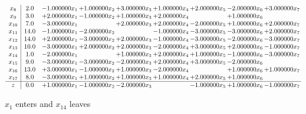 \documentclass[10pt]{article}
\begin{document}
\[\begin{array}{c| c c@{\hskip 2pt} c@{\hskip 2pt} c@{\hskip 2pt} c@{\hskip 2pt} c@{\hskip 2pt} c@{\hskip 2pt} c@{\hskip 2pt} }
 x_{8}   &  2.0 & -1.000000 x_{1} & + 1.000000 x_{2} & + 3.000000 x_{3} & + 1.000000 x_{4} & + 2.000000 x_{5} & -2.000000 x_{6} & + 3.000000 x_{7}\\
 x_{9}   &  3.0 & + 2.000000 x_{1} & -1.000000 x_{2} & + 1.000000 x_{3} & + 2.000000 x_{4} &   & + 1.000000 x_{6} &   \\
 x_{10}   &  7.0 & -3.000000 x_{1} &   & + 2.000000 x_{3} & + 2.000000 x_{4} & -2.000000 x_{5} & + 1.000000 x_{6} & + 2.000000 x_{7}\\
 x_{11}   &  14.0 & -1.000000 x_{1} & -2.000000 x_{2} &   & -1.000000 x_{4} & -3.000000 x_{5} & -3.000000 x_{6} & + 2.000000 x_{7}\\
 x_{12}   &  14.0 & + 2.000000 x_{1} & -3.000000 x_{2} & + 2.000000 x_{3} & -1.000000 x_{4} & -3.000000 x_{5} & -2.000000 x_{6} & -3.000000 x_{7}\\
 x_{13}   &  10.0 & -3.000000 x_{1} & + 2.000000 x_{2} & + 2.000000 x_{3} & -2.000000 x_{4} & + 3.000000 x_{5} & + 2.000000 x_{6} & -1.000000 x_{7}\\
 x_{14}   &  1.0 & -2.000000 x_{1} &   & + 1.000000 x_{3} & + 2.000000 x_{4} & + 1.000000 x_{5} & -1.000000 x_{6} & -3.000000 x_{7}\\
 x_{15}   &  9.0 & -3.000000 x_{1} & -3.000000 x_{2} & -2.000000 x_{3} & + 2.000000 x_{4} & + 3.000000 x_{5} & -2.000000 x_{6} &   \\
 x_{16}   &  13.0 & + 3.000000 x_{1} & -1.000000 x_{2} & + 1.000000 x_{3} & -2.000000 x_{4} &   & + 1.000000 x_{6} & + 1.000000 x_{7}\\
 x_{17}   &  8.0 & -3.000000 x_{1} & + 1.000000 x_{2} & + 1.000000 x_{3} & + 1.000000 x_{4} & + 2.000000 x_{5} & + 1.000000 x_{6} &   \\
\hline
z    &  0.0 & + 1.000000 x_{1} & -1.000000 x_{2} & -2.000000 x_{3} &   & -1.000000 x_{5} & + 1.000000 x_{6} & -1.000000 x_{7}\\
\end{array}\]


 $ x_{1} $ enters and $ x_{14} $ leaves 
\end{document}
